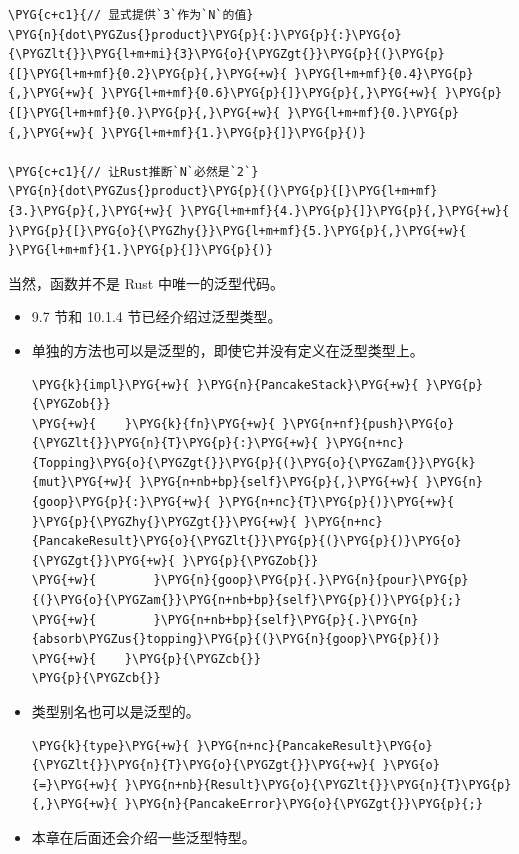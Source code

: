 \begin{Verbatim}[commandchars=\\\{\},breaklines=true,breakanywhere=true,fontsize=\codefont,xleftmargin=17bp]
\PYG{c+c1}{// 显式提供`3`作为`N`的值}
\PYG{n}{dot\PYGZus{}product}\PYG{p}{:}\PYG{p}{:}\PYG{o}{\PYGZlt{}}\PYG{l+m+mi}{3}\PYG{o}{\PYGZgt{}}\PYG{p}{(}\PYG{p}{[}\PYG{l+m+mf}{0.2}\PYG{p}{,}\PYG{+w}{ }\PYG{l+m+mf}{0.4}\PYG{p}{,}\PYG{+w}{ }\PYG{l+m+mf}{0.6}\PYG{p}{]}\PYG{p}{,}\PYG{+w}{ }\PYG{p}{[}\PYG{l+m+mf}{0.}\PYG{p}{,}\PYG{+w}{ }\PYG{l+m+mf}{0.}\PYG{p}{,}\PYG{+w}{ }\PYG{l+m+mf}{1.}\PYG{p}{]}\PYG{p}{)}

\PYG{c+c1}{// 让Rust推断`N`必然是`2`}
\PYG{n}{dot\PYGZus{}product}\PYG{p}{(}\PYG{p}{[}\PYG{l+m+mf}{3.}\PYG{p}{,}\PYG{+w}{ }\PYG{l+m+mf}{4.}\PYG{p}{]}\PYG{p}{,}\PYG{+w}{ }\PYG{p}{[}\PYG{o}{\PYGZhy{}}\PYG{l+m+mf}{5.}\PYG{p}{,}\PYG{+w}{ }\PYG{l+m+mf}{1.}\PYG{p}{]}\PYG{p}{)}
\end{Verbatim}

当然，函数并不是 Rust 中唯一的泛型代码。

\begin{itemize}
\item 9.7 节和 10.1.4 节已经介绍过泛型类型。
\item 单独的方法也可以是泛型的，即使它并没有定义在泛型类型上。

\begin{Verbatim}[commandchars=\\\{\},breaklines=true,breakanywhere=true,fontsize=\codefont,xleftmargin=17bp]
\PYG{k}{impl}\PYG{+w}{ }\PYG{n}{PancakeStack}\PYG{+w}{ }\PYG{p}{\PYGZob{}}
\PYG{+w}{    }\PYG{k}{fn}\PYG{+w}{ }\PYG{n+nf}{push}\PYG{o}{\PYGZlt{}}\PYG{n}{T}\PYG{p}{:}\PYG{+w}{ }\PYG{n+nc}{Topping}\PYG{o}{\PYGZgt{}}\PYG{p}{(}\PYG{o}{\PYGZam{}}\PYG{k}{mut}\PYG{+w}{ }\PYG{n+nb+bp}{self}\PYG{p}{,}\PYG{+w}{ }\PYG{n}{goop}\PYG{p}{:}\PYG{+w}{ }\PYG{n+nc}{T}\PYG{p}{)}\PYG{+w}{ }\PYG{p}{\PYGZhy{}\PYGZgt{}}\PYG{+w}{ }\PYG{n+nc}{PancakeResult}\PYG{o}{\PYGZlt{}}\PYG{p}{(}\PYG{p}{)}\PYG{o}{\PYGZgt{}}\PYG{+w}{ }\PYG{p}{\PYGZob{}}
\PYG{+w}{        }\PYG{n}{goop}\PYG{p}{.}\PYG{n}{pour}\PYG{p}{(}\PYG{o}{\PYGZam{}}\PYG{n+nb+bp}{self}\PYG{p}{)}\PYG{p}{;}
\PYG{+w}{        }\PYG{n+nb+bp}{self}\PYG{p}{.}\PYG{n}{absorb\PYGZus{}topping}\PYG{p}{(}\PYG{n}{goop}\PYG{p}{)}
\PYG{+w}{    }\PYG{p}{\PYGZcb{}}
\PYG{p}{\PYGZcb{}}
\end{Verbatim}

\item 类型别名也可以是泛型的。

\begin{Verbatim}[commandchars=\\\{\},breaklines=true,breakanywhere=true,fontsize=\codefont,xleftmargin=17bp]
\PYG{k}{type}\PYG{+w}{ }\PYG{n+nc}{PancakeResult}\PYG{o}{\PYGZlt{}}\PYG{n}{T}\PYG{o}{\PYGZgt{}}\PYG{+w}{ }\PYG{o}{=}\PYG{+w}{ }\PYG{n+nb}{Result}\PYG{o}{\PYGZlt{}}\PYG{n}{T}\PYG{p}{,}\PYG{+w}{ }\PYG{n}{PancakeError}\PYG{o}{\PYGZgt{}}\PYG{p}{;}
\end{Verbatim}

\item 本章在后面还会介绍一些泛型特型。
\end{itemize}

